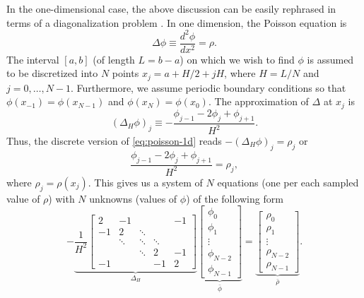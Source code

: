 In the one-dimensional case, the above discussion can be easily rephrased in terms of a diagonalization problem \cite{demanet2013fourier}.
In one dimension, the Poisson equation is
\begin{equation}\label{eq:poisson-1d}
    \Delta \phi \equiv \frac{d^2 \phi}{dx^2} = \rho.
\end{equation}
The interval $[a, b]$ (of length $L = b-a$) on which we wish to find $\phi$ is assumed to be discretized into $N$ points $x_j = a + H/2 + jH$, where $H = L / N$ and $j=0,\dots, N-1$.
Furthermore, we assume periodic boundary conditions so that $\phi(x_{-1}) = \phi(x_{N-1})$ and $\phi(x_{N}) = \phi(x_0)$.
The approximation of $\Delta$ at $x_j$ is
\begin{equation*}
    (\Delta_H \phi)_j \equiv -\frac{\phi_{j-1} - 2\phi_j + \phi_{j+1}}{H^2}.
\end{equation*}
Thus, the discrete version of \autoref{eq:poisson-1d} reads $-(\Delta_H \phi)_j = \rho_j$ or
\begin{equation*}
    \frac{\phi_{j-1}-2\phi_j + \phi_{j+1}}{H^2} = \rho_j,
\end{equation*}
where $\rho_j = \rho(x_j)$.
This gives us a system of $N$ equations (one per each sampled value of $\rho$) with $N$ unknowns (values of $\phi$) of the following form
\begin{equation}\label{eq:poisson-1d-matrix}
    -\underbrace{\frac{1}{H^2}
        \begin{bmatrix}
            2  & -1     &        &        & -1 \\
            -1 & 2      & \ddots &        &    \\
               & \ddots & \ddots & \ddots &    \\
               &        & \ddots & 2      & -1 \\
            -1 &        &        & -1     & 2
        \end{bmatrix}}_{\Delta_H}
    \underbrace{\begin{bmatrix}
            \phi_0     \\
            \phi_1     \\
            \vdots     \\
            \phi_{N-2} \\
            \phi_{N-1}
        \end{bmatrix}}_{\bar{\phi}}
    = \underbrace{\begin{bmatrix}
            \rho_0     \\
            \rho_1     \\
            \vdots     \\
            \rho_{N-2} \\
            \rho_{N-1}
        \end{bmatrix}}_{\bar{\rho}}.
\end{equation}
